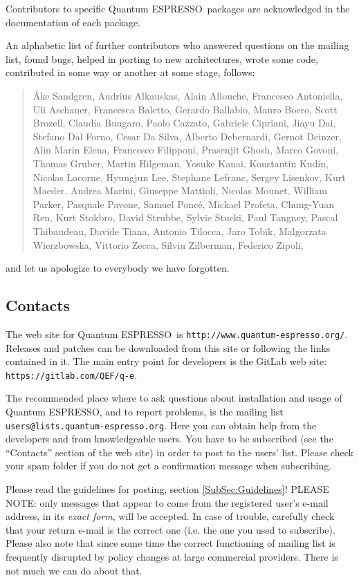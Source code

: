 \documentclass[12pt,a4paper]{article}
\def\qe{{\sc Quantum ESPRESSO}}
\begin{document}
Contributors to specific \qe\ packages are acknowledged in the
documentation of each package.

An alphabetic list of further
contributors who answered questions on the mailing list, found
bugs, helped in porting to new architectures, wrote some code,
contributed in some way or another at some stage, follows:
\begin{quote}
  {\AA}ke Sandgren, Audrius Alkauskas, Alain Allouche, Francesco Antoniella,
  Uli Aschauer, Francesca Baletto, Gerardo Ballabio, Mauro Boero,
  Scott Brozell, Claudia Bungaro, Paolo Cazzato, Gabriele Cipriani,
  Jiayu Dai, Stefano Dal Forno, Cesar Da Silva, Alberto Debernardi,
  Gernot Deinzer, Alin Marin Elena, Francesco Filipponi, Prasenjit Ghosh,
  Marco Govoni, Thomas Gruber, Martin Hilgeman, Yosuke Kanai, Konstantin Kudin,
  Nicolas Lacorne, Hyungjun Lee, Stephane Lefranc, Sergey Lisenkov, Kurt Maeder,
  Andrea Marini, Giuseppe Mattioli, Nicolas Mounet, William Parker,
  Pasquale Pavone, Samuel Ponc\'e, Mickael Profeta, Chung-Yuan Ren,
  Kurt Stokbro, David Strubbe, Sylvie Stucki, Paul Tangney, Pascal Thibaudeau,
  Davide Tiana, Antonio Tilocca, Jaro Tobik, Malgorzata Wierzbowska,
  Vittorio Zecca, Silviu Zilberman, Federico Zipoli,
\end{quote}
and let us apologize to everybody we have forgotten.

\subsection{Contacts}
\label{SubSec:Contacts}

The web site for \qe\ is \texttt{http://www.quantum-espresso.org/}.
Releases and patches can be downloaded from this
site or following the links contained in it. The main entry point for
developers is the GitLab web site:
\texttt{https://gitlab.com/QEF/q-e}.

The recommended place where to ask questions about installation
and usage of \qe, and to report problems, is the 
mailing list \texttt{users@lists.quantum-espresso.org}.
Here you can obtain help from the developers and from
knowledgeable users. You have to be subscribed (see the ``Contacts''
section of the web site) in order to post to the  users' list.
Please check your spam folder if you do not get a confirmation
message when subscribing.

Please read the guidelines for posting, section \ref{SubSec:Guidelines}!
PLEASE NOTE: only messages that appear to come from the
registered user's e-mail address, in its {\em exact form}, will be
accepted. In case of trouble, carefully check that your return
e-mail is the correct one (i.e. the one you used to subscribe).
Please also note that since some time the correct functioning of mailing
list is frequently disrupted by policy changes at large commercial
providers. There is not much we can do about that.
\end{document}
